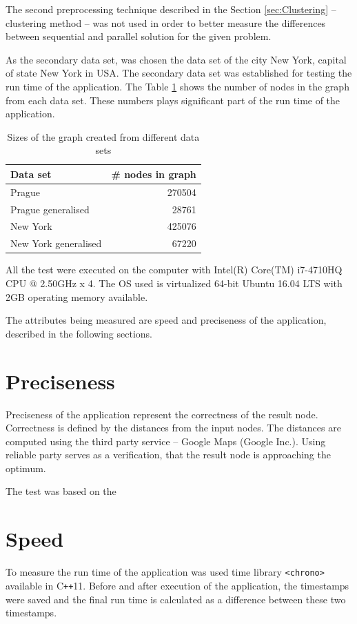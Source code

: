\documentclass[thesis=M,english]{FITthesis}[2012/10/20]
\begin{document}
The second preprocessing technique described in the Section \ref{sec:Clustering} -- clustering method -- was not used in order to better measure the differences between sequential and parallel solution for the given problem. 


As the secondary data set, was chosen the data set of the city New York, capital of state New York in USA. The secondary data set was established for testing the run time of the application. The Table \ref{tab:gnodes} shows the number of nodes in the graph from each data set. These numbers plays significant part of the run time of the application.

\begin{table}[h]
 \centering
 \caption{Sizes of the graph created from different data sets}
 \label{tab:gnodes}
 \begin{tabular}{|l|r|}
 \hline
 \textbf{Data set}    & \textbf{\# nodes in graph} \\ \hline
 Prague               & 270504                     \\ \hline
 Prague generalised   & 28761                      \\ \hline
 New York             & 425076                     \\ \hline
 New York generalised & 67220                      \\ \hline
 \end{tabular}
\end{table}


All the test were executed on the computer with Intel(R) Core(TM) i7-4710HQ CPU @ 2.50GHz x 4. The OS used is virtualized 64-bit Ubuntu 16.04 LTS with 2GB operating memory available.


The attributes being measured are speed and preciseness of the application, described in the following sections.

\section{Preciseness}
Preciseness of the application represent the correctness of the result node. Correctness is defined by the distances from the input nodes. The distances are computed using the third party service -- Google Maps (Google Inc.). Using reliable party serves as a verification, that the result node is approaching the optimum.

The test was based on the 

\section{Speed}
To measure the run time of the application was used time library \texttt{<chrono>} available in C\texttt{++}11. Before and after execution of the application, the timestamps were saved and the final run time is calculated as a difference between these two timestamps.
\end{document}
